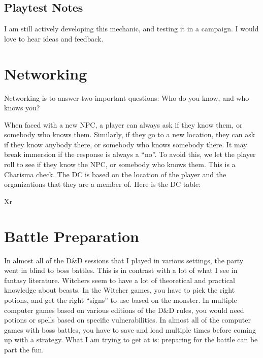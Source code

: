 \documentclass[twocolumn]{dndbook}
\begin{document}
\subsection{Playtest Notes}

I am still actively developing this mechanic, and testing it in a campaign. I would love to hear ideas and feedback.\par

\section{Networking}

\begin{emphasisParagraph}
	Networking is to answer two important questions:
	Who do you know, and who knows you?
\end{emphasisParagraph}

When faced with a new NPC, a player can always ask if they know them, or somebody who knows them.
Similarly, if they go to a new location, they can ask if they know anybody there, or somebody who knows somebody there.
It may break immersion if the response is always a ``no''.
To avoid this, we let the player roll to see if they know the NPC, or somebody who knows them.
This is a Charisma check.
The DC is based on the location of the player and the organizations that they are a member of.
Here is the DC table:

\begin{DndTable}[header=Networking DC]{Xr}
\end{DndTable}


\section{Battle Preparation}
\label{sec:battle_preparation}

In almost all of the D\&D sessions that I played in various settings, the party went in blind to boss battles.
This is in contrast with a lot of what I see in fantasy literature.
Witchers seem to have a lot of theoretical and practical knowledge about beasts.
In the Witcher games, you have to pick the right potions, and get the right ``signs'' to use based on the monster.
In multiple computer games based on various editions of the D\&D rules, you would need potions or spells based on specific vulnerabilities.
In almost all of the computer games with boss battles, you have to save and load multiple times before coming up with a strategy.
What I am trying to get at is: preparing for the battle can be part the fun.\par
\end{document}
